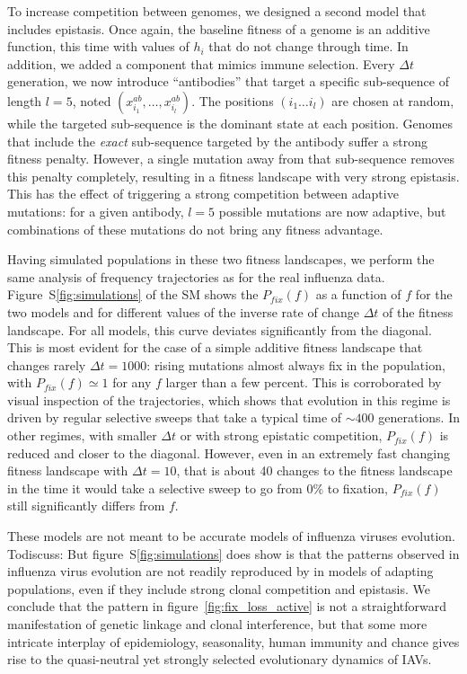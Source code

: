 \documentclass[reprint,amsmath,amssymb,superscriptaddress,showpacs,pre]{revtex4-1}
\newcommand{\discuss}[1]{{\color{green}Todiscuss: #1}}
\newcommand{\sref}[1]{S\ref{#1}}
\begin{document}
To increase competition between genomes, we designed a second model that includes epistasis. 
Once again, the baseline fitness of a genome is an additive function, this time with values of $h_i$ that do not change through time. 
In addition, we added a component that mimics immune selection.
Every $\Delta t$ generation, we now introduce ``antibodies'' that target a specific sub-sequence of length $l=5$, noted $(x^{ab}_{i_1}, \ldots, x^{ab}_{i_l})$. 
The positions $(i_1\ldots i_l)$ are chosen at random, while the targeted sub-sequence is the dominant state at each position.
Genomes that include the \emph{exact} sub-sequence targeted by the antibody suffer a strong fitness penalty. However, a single mutation away from that sub-sequence removes this penalty completely, resulting in a fitness landscape with very strong epistasis. 
This has the effect of triggering a strong competition between adaptive mutations: for a given antibody, $l=5$ possible mutations are now adaptive, but combinations of these mutations do not bring any fitness advantage.

Having simulated populations in these two fitness landscapes, we perform the same analysis of frequency trajectories as for the real influenza data. 
Figure~\sref{fig:simulations} of the SM shows the $P_{fix}(f)$ as a function of $f$ for the two models and for different values of the inverse rate of change $\Delta t$ of the fitness landscape. 
For all models, this curve deviates significantly from the diagonal. 
This is most evident for the case of a simple additive fitness landscape that changes rarely $\Delta t=1000$: rising mutations almost always fix in the population, with $P_{fix}(f)\simeq 1$ for any $f$ larger than a few percent. 
This is corroborated by visual inspection of the trajectories, which shows that evolution in this regime is driven by regular selective sweeps that take a typical time of $\sim 400$ generations. 
In other regimes, with smaller $\Delta t$ or with strong epistatic competition, $P_{fix}(f)$ is reduced and closer to the diagonal. 
However, even in an extremely fast changing fitness landscape with $\Delta t=10$, that is about 40 changes to the fitness landscape in the time it would take a selective sweep to go from 0\% to fixation, $P_{fix}(f)$ still significantly differs from $f$. 

These models are not meant to be accurate models of influenza viruses evolution. 
\discuss{But figure~\sref{fig:simulations} does show is that the patterns observed in influenza virus evolution are not readily reproduced by in models of adapting populations, even if they include strong clonal competition and epistasis.
We conclude that the pattern in figure~\ref{fig:fix_loss_active} is not a straightforward manifestation of genetic linkage and clonal interference, but that some more intricate interplay of epidemiology, seasonality, human immunity and chance gives rise to the quasi-neutral yet strongly selected evolutionary dynamics of IAVs.} 
\end{document}
